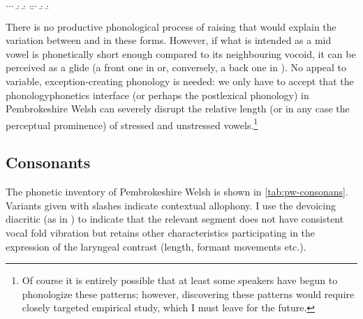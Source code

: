 \ex.\a.\a.
\b.
\b.
\z.\b.\a.
\b.
\b.

There is no productive phonological process of raising that would explain the variation between \ipa{[e]} and \ipa{[i]} in these forms. However, if what is intended as a mid vowel is phonetically short enough compared to its neighbouring vocoid, it can be perceived as a glide (a front one in  or, conversely, a back one in ). No appeal to variable, exception-creating phonology is needed: we only have to accept that the phonology\endash phonetics interface (or perhaps the postlexical phonology) in Pembrokeshire Welsh can severely disrupt the relative length (or in any case the perceptual prominence) of stressed and unstressed vowels.\footnote{Of course it is entirely possible that at least some speakers have begun to phonologize these patterns; however, discovering these patterns would require closely targeted empirical study, which I must leave for the future.}


\subsection{Consonants}
\label{sec:consonants}

The phonetic inventory of Pembrokeshire Welsh is shown in \cref{tab:pw-consonans}. Variants given with slashes indicate contextual allophony. I use the devoicing diacritic (as in \eg {}) to indicate that the relevant segment does not have consistent vocal fold vibration but retains other characteristics participating in the expression of the laryngeal contrast (\eg length, formant movements etc.).

